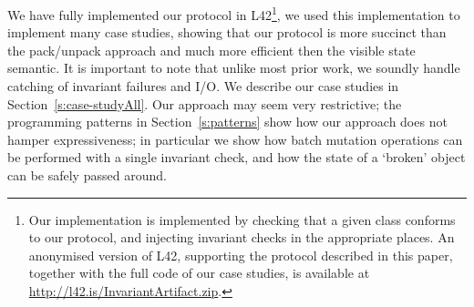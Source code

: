 We have fully implemented our protocol in L42\footnote{
Our implementation is implemented by checking that a given class conforms to our protocol, and injecting invariant checks in the appropriate places.
An anonymised version of L42, supporting the protocol described in this paper, together with the full code of our case studies, is available at \url{http://l42.is/InvariantArtifact.zip}. %
}, we used this implementation to implement many case studies, showing that our protocol is more succinct than the pack/unpack approach and much more efficient then the visible state semantic.
It is important to note that unlike most prior work, we soundly handle catching of invariant failures and I/O.
We describe our case studies in Section~\ref{s:case-studyAll}.
Our approach may seem very restrictive;
the programming patterns in Section~\ref{s:patterns} show how our approach does not hamper expressiveness; in particular we show how batch mutation operations can be performed with a single invariant check, and how the state of a `broken' object can be safely passed around.




